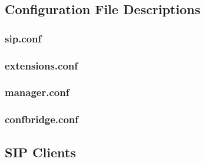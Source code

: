 \documentclass[a4paper,11pt]{report}
\begin{document}
\subsection{Configuration File Descriptions}

\subsubsection{sip.conf}
\lstset{escapechar=@,style=customc}


\subsubsection{extensions.conf}


\subsubsection{manager.conf}


\subsubsection{confbridge.conf}


\newpage
\subsection{SIP Clients}
\end{document}
